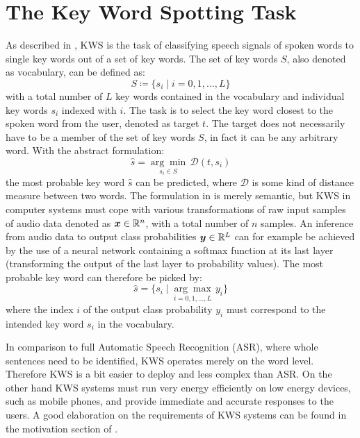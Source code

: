 
\section{The Key Word Spotting Task}\label{sec:intro_kws}
As described in , KWS is the task of classifying speech signals of spoken words to single key words out of a set of key words.
The set of key words $S$, also denoted as vocabulary, can be defined as:
\begin{equation}\label{eq:intro_kws_dict}
	S \coloneqq \{s_i \mid i = 0, 1, \dots, L\}
\end{equation}
with a total number of $L$ key words contained in the vocabulary and individual key words $s_i$ indexed with $i$.
The task is to select the key word closest to the spoken word from the user, denoted as target $t$.
The target does not necessarily have to be a member of the set of key words $S$, in fact it can be any arbitrary word.
With the abstract formulation:
\begin{equation}\label{eq:intro_kws_task}
	\hat{s} = \underset{s_i \in S}{\arg \min} \, \mathcal{D}(t, s_i)
\end{equation}
the most probable key word $\hat{s}$ can be predicted, where $\mathcal{D}$ is some kind of distance measure between two words.
The formulation in  is merely semantic, but KWS in computer systems must cope with various transformations of raw input samples of audio data denoted as $\bm{x} \in \mathbb{R}^n$, with a total number of $n$ samples.
An inference from audio data to output class probabilities $\bm{y} \in \mathbb{R}^L$ can for example be achieved by the use of a neural network containing a softmax function at its last layer (transforming the output of the last layer to probability values).
The most probable key word can therefore be picked by:
\begin{equation}\label{eq:intro_kws_class}
	\hat{s} = \{s_i \mid \underset{i = 0, 1, \dots, L}{\arg \max} \, y_i\}
\end{equation}
where the index $i$ of the output class probability $y_i$ must correspond to the intended key word $s_i$ in the vocabulary.

In comparison to full Automatic Speech Recognition (ASR), where whole sentences need to be identified, KWS operates merely on the word level.
Therefore KWS is a bit easier to deploy and less complex than ASR.
On the other hand KWS systems must run very energy efficiently on low energy devices, such as mobile phones, and provide immediate and accurate responses to the users.
A good elaboration on the requirements of KWS systems can be found in the motivation section of \cite{Warden2018}.